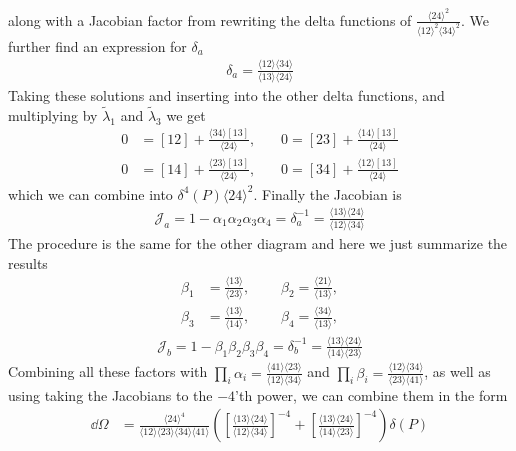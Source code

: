 \documentclass[letter,11pt]{article}
\newcommand{\ab}[1]{\langle #1 \rangle}
\newcommand{\sqb}[1]{[ #1 ]}
\begin{document}
along with a Jacobian factor from rewriting the delta functions of $\frac{\ab{24}^2}{\ab{12}^2\ab{34}^2}$.
We further find an expression for $\delta_a$
\begin{equation}
	\begin{aligned}
\delta_a=\frac{\langle 1 2 \rangle \langle 34 \rangle}{ \langle 13 \rangle\langle 24 \rangle}
	\end{aligned}
\end{equation}
Taking these solutions and inserting into the other delta functions, and multiplying by $\tilde\lambda_1$ and $\tilde\lambda_3$ we get
\begin{equation}
	\begin{aligned}
	0&=	\sqb{12}+\frac{\ab{34}\sqb{13}}{\ab{24}}
,	~~~~~~~~
	0=	\sqb{23}+\frac{\ab{14}\sqb{13}}{\ab{24}}
	\\
	0&=	\sqb{14}+\frac{\ab{23}\sqb{13}}{\ab{24}}
,	~~~~~~~~
	0=	\sqb{34}+\frac{\ab{12}\sqb{13}}{\ab{24}}
	\end{aligned}
\end{equation}
which we can combine into $\delta^4(P)\ab{24}^2$. Finally the Jacobian is
\begin{equation}
	\begin{aligned}
		\mathcal{J}_a=1-\alpha_{1}\alpha_{2}\alpha_{3}\alpha_{4}=\delta_a^{-1}=
		\frac{ \langle 13 \rangle\langle 24 \rangle}{\langle 1 2 \rangle \langle 34 \rangle}
	\end{aligned}
\end{equation}
The procedure is the same for the other diagram and here we just summarize the results
\begin{equation}
	\begin{aligned}
		\beta_1&=\frac{\langle 13 \rangle}{\langle 23\rangle},~~~~~~~~~~\beta_2=\frac{\langle 21 \rangle}{\langle 13\rangle},\\
		\beta_3&=\frac{\langle 13 \rangle}{\langle 14\rangle},~~~~~~~~~~	\beta_4=\frac{\langle 34 \rangle}{\langle 13\rangle},
	\end{aligned}
\end{equation}
\begin{equation}
	\begin{aligned}
		\mathcal{J}_b=1-\beta_{1}\beta_{2}\beta_{3}\beta_{4}=\delta_b^{-1}=
		\frac{ \langle 13 \rangle\langle 24 \rangle}{\langle 1 4 \rangle \langle 23 \rangle}
	\end{aligned}
\end{equation}
Combining all these factors with $\prod_i \alpha_i=\frac{\ab{41}\ab{23}}{\ab{12}\ab{34}}$ and $\prod_i \beta_i=\frac{\ab{12}\ab{34}}{\ab{23}\ab{41}}$, as well as using taking the Jacobians to the $-4$'th power, we can combine them in the form
\begin{equation}
	\begin{aligned}
		\dd \Omega &=\frac{\ab{24}^4}{\ab{12}\ab{23}\ab{34}\ab{41}}\left( \left[\frac{ \langle 13 \rangle\langle 24 \rangle}{\langle 1 2 \rangle \langle 34 \rangle}\right]^{-4}+\left[	\frac{ \langle 13 \rangle\langle 24 \rangle}{\langle 1 4 \rangle \langle 23 \rangle}\right]^{-4}\right)\delta(P)\\
	\end{aligned}
\end{equation}
\end{document}
